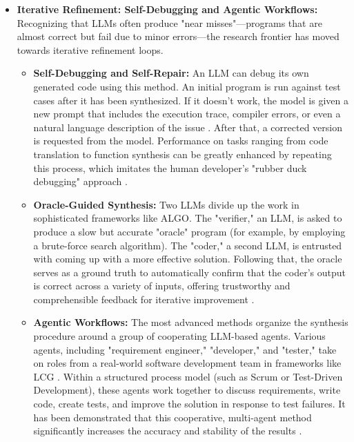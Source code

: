 \documentclass[12pt, a4paper]{report}
\begin{document}
\begin{itemize}
    \item \textbf{Iterative Refinement: Self-Debugging and Agentic Workflows:} Recognizing that LLMs often produce "near misses"—programs that are almost correct but fail due to minor errors—the research frontier has moved towards iterative refinement loops.
    
    \begin{itemize}
        \item \textbf{Self-Debugging and Self-Repair:} An LLM can debug its own generated code using this method. An initial program is run against test cases after it has been synthesized. If it doesn't work, the model is given a new prompt that includes the execution trace, compiler errors, or even a natural language description of the issue \citep{huang2023jensen}. After that, a corrected version is requested from the model. Performance on tasks ranging from code translation to function synthesis can be greatly enhanced by repeating this process, which imitates the human developer's "rubber duck debugging" approach \citep{shinn2023reflexion}.
        
        \item \textbf{Oracle-Guided Synthesis:} Two LLMs divide up the work in sophisticated frameworks like ALGO. The "verifier," an LLM, is asked to produce a slow but accurate "oracle" program (for example, by employing a brute-force search algorithm). The "coder," a second LLM, is entrusted with coming up with a more effective solution. Following that, the oracle serves as a ground truth to automatically confirm that the coder's output is correct across a variety of inputs, offering trustworthy and comprehensible feedback for iterative improvement \citep{zhang2024algo}.
        
        \item \textbf{Agentic Workflows:} The most advanced methods organize the synthesis procedure around a group of cooperating LLM-based agents. Various agents, including "requirement engineer," "developer," and "tester," take on roles from a real-world software development team in frameworks like LCG \citep{zeng2024large}. Within a structured process model (such as Scrum or Test-Driven Development), these agents work together to discuss requirements, write code, create tests, and improve the solution in response to test failures. It has been demonstrated that this cooperative, multi-agent method significantly increases the accuracy and stability of the results \citep{zeng2024large}.
    \end{itemize}
\end{itemize}
\end{document}
